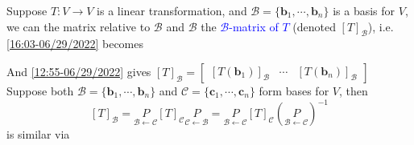 \documentclass{beamer}
\theoremstyle{definition}
\theoremstyle{remark}
\begin{document}
\begin{frame}[t]
\begin{definition}
Suppose $T:V\to V$ is a linear transformation, and $\mathcal B=\{\bm b_1,\cdots,\bm b_n\}$ is a basis for $V$, we can the matrix relative to $\mathcal B$ and $\mathcal B$ the \textcolor{blue}{$\mathcal B$-matrix of $T$} (denoted $[T]_{\mathcal B}$), i.e. \eqref{16:03-06/29/2022} becomes
\begin{center}
\quad
{}
\end{center}
And \eqref{12:55-06/29/2022} gives $[T]_{\mathcal B}=\begin{bmatrix}
[T(\bm b_1)]_{\mathcal B}&\cdots&[T(\bm b_n)]_{\mathcal B}
\end{bmatrix}$
Suppose both $\mathcal B=\{\bm b_1,\cdots,\bm b_n\}$ and $\mathcal C=\{\bm c_1,\cdots,\bm c_n\}$ form bases for $V$, then
\[
[T]_{\mathcal B}=\underset{\mathcal B\leftarrow\mathcal C}{P}[T]_{\mathcal C}\underset{\mathcal C\leftarrow\mathcal B}{P}=\underset{\mathcal B\leftarrow\mathcal C}{P}[T]_{\mathcal C}\left(\underset{\mathcal B\leftarrow\mathcal C}{P}\right)^{-1}
\]
is similar via
\end{definition}
\end{frame}
\end{document}
